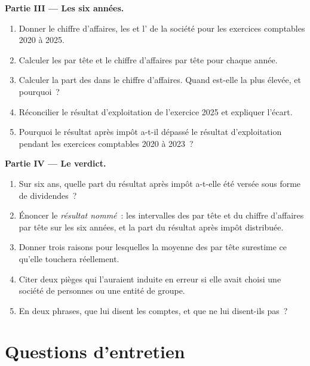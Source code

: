 \begin{problem}
\medskip\noindent\textbf{Partie III --- Les six années.}
\begin{enumerate}[resume]
\item Donner le chiffre d'affaires, les  et l' de la société pour les exercices comptables 2020 à 2025.
\item Calculer les  par tête et le chiffre d'affaires par tête pour chaque année.
\item Calculer la part des  dans le chiffre d'affaires. Quand est-elle la plus élevée, et pourquoi~?
\item Réconcilier le résultat d'exploitation de l'exercice 2025 et expliquer l'écart.
\item Pourquoi le résultat après impôt a-t-il dépassé le résultat d'exploitation pendant les exercices comptables 2020 à 2023~?
\end{enumerate}

\medskip\noindent\textbf{Partie IV --- Le verdict.}
\begin{enumerate}[resume]
\item Sur six ans, quelle part du résultat après impôt a-t-elle été versée sous forme de dividendes~?
\item Énoncer le \emph{résultat nommé}~: les intervalles des  par tête et du chiffre d'affaires par tête sur les six années, et
la part du résultat après impôt distribuée.
\item Donner trois raisons pour lesquelles la moyenne des  par tête surestime ce qu'elle touchera réellement.
\item Citer deux pièges qui l'auraient induite en erreur si elle avait choisi une société de personnes ou une entité de groupe.
\item En deux phrases, que lui disent les comptes, et que ne lui disent-ils pas~?
\end{enumerate}
\end{problem}

\section{Questions d'entretien}

